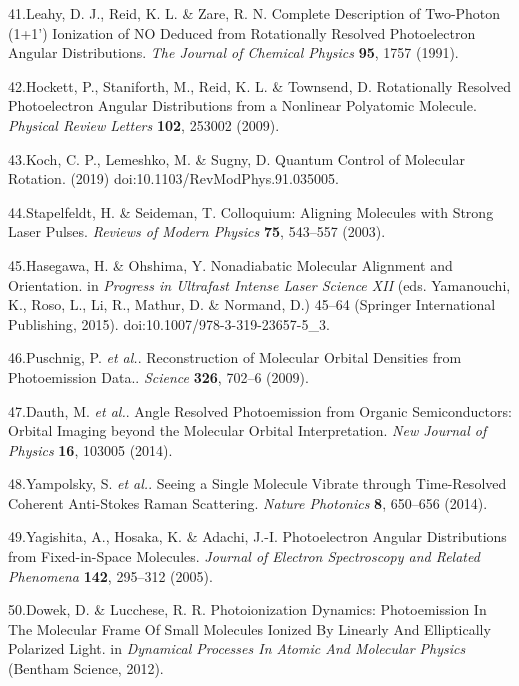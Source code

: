 \documentclass[10pt]{article}
\begin{document}
\label{csl:41}41.Leahy, D. J., Reid, K. L. \& Zare, R. N. {Complete Description of Two-Photon (1+1') Ionization of {{NO}} Deduced from Rotationally Resolved Photoelectron Angular Distributions}. \textit{The Journal of Chemical Physics} \textbf{95}, 1757 (1991).

\label{csl:42}42.Hockett, P., Staniforth, M., Reid, K. L. \& Townsend, D. {Rotationally {{Resolved Photoelectron Angular Distributions}} from a {{Nonlinear Polyatomic Molecule}}}. \textit{Physical Review Letters} \textbf{102}, 253002 (2009).

\label{csl:43}43.Koch, C. P., Lemeshko, M. \& Sugny, D. {Quantum Control of Molecular Rotation}. (2019) doi:10.1103/RevModPhys.91.035005.

\label{csl:44}44.Stapelfeldt, H. \& Seideman, T. {Colloquium: {{Aligning}} Molecules with Strong Laser Pulses}. \textit{Reviews of Modern Physics} \textbf{75}, 543–557 (2003).

\label{csl:45}45.Hasegawa, H. \& Ohshima, Y. {Nonadiabatic {{Molecular Alignment}} and {{Orientation}}}. in \textit{Progress in {{Ultrafast Intense Laser Science XII}}} (eds. Yamanouchi, K., Roso, L., Li, R., Mathur, D. \& Normand, D.) 45–64 ({Springer International Publishing}, 2015). doi:10.1007/978-3-319-23657-5_3.

\label{csl:46}46.Puschnig, P. \textit{et al.}. {Reconstruction of Molecular Orbital Densities from Photoemission Data.}. \textit{Science} \textbf{326}, 702–6 (2009).

\label{csl:47}47.Dauth, M. \textit{et al.}. {Angle Resolved Photoemission from Organic Semiconductors: Orbital Imaging beyond the Molecular Orbital Interpretation}. \textit{New Journal of Physics} \textbf{16}, 103005 (2014).

\label{csl:48}48.Yampolsky, S. \textit{et al.}. {Seeing a Single Molecule Vibrate through Time-Resolved Coherent Anti-{{Stokes Raman}} Scattering}. \textit{Nature Photonics} \textbf{8}, 650–656 (2014).

\label{csl:49}49.Yagishita, A., Hosaka, K. \& Adachi, J.-I. {Photoelectron Angular Distributions from Fixed-in-Space Molecules}. \textit{Journal of Electron Spectroscopy and Related Phenomena} \textbf{142}, 295–312 (2005).

\label{csl:50}50.Dowek, D. \& Lucchese, R. R. {Photoionization {{Dynamics}}: {{Photoemission In The Molecular Frame Of Small Molecules Ionized By Linearly And Elliptically Polarized Light}}}. in \textit{Dynamical {{Processes In Atomic And Molecular Physics}}} ({Bentham Science}, 2012).
\end{document}

